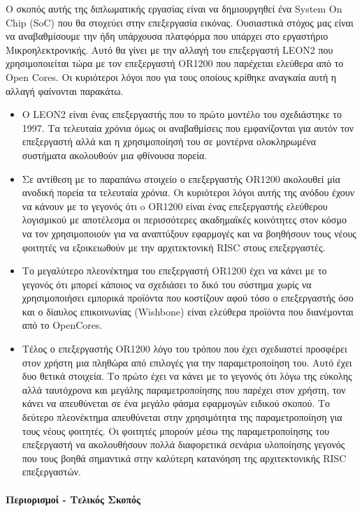 \documentclass[a4paper,10pt]{article}
\numberwithin{figure}{section}
\numberwithin{table}{section}
\begin{document}
Ο σκοπός αυτής της διπλωματικής εργασίας είναι να δημιουργηθεί ένα System On Chip (SoC) που θα στοχεύει στην επεξεργασία εικόνας. Ουσιαστικά στόχος μας είναι να αναβαθμίσουμε την ήδη υπάρχουσα πλατφόρμα που υπάρχει στο εργαστήριο Μικροηλεκτρονικής. Αυτό θα γίνει με την αλλαγή του επεξεργαστή LEON2 που χρησιμοποιείται τώρα με τον επεξεργαστή OR1200 που παρέχεται ελεύθερα από το Open Cores. Οι κυριότεροι λόγοι που για τους οποίους κρίθηκε αναγκαία αυτή η αλλαγή φαίνονται παρακάτω.
\begin{itemize}
 \item O LEON2 είναι ένας επεξεργαστής που το πρώτο μοντέλο του σχεδιάστηκε το 1997. Τα τελευταία χρόνια όμως οι αναβαθμίσεις που εμφανίζονται για αυτόν τον επεξεργαστή αλλά και η χρησιμοποίησή του σε μοντέρνα ολοκληρωμένα συστήματα ακολουθούν μια φθίνουσα πορεία.
 \item Σε αντίθεση με το παραπάνω στοιχείο ο επεξεργαστής OR1200 ακολουθεί μία ανοδική πορεία τα τελευταία χρόνια. Οι κυριότεροι λόγοι αυτής της ανόδου έχουν να κάνουν με το γεγονός ότι o OR1200 είναι ένας επεξεργαστής ελεύθερου λογισμικού με αποτέλεσμα οι περισσότερες ακαδημαϊκές κοινότητες στον κόσμο να τον χρησιμοποιούν για να αναπτύξουν εφαρμογές και να βοηθήσουν τους νέους φοιτητές να εξοικειωθούν με την αρχιτεκτονική RISC στους επεξεργαστές.
 \item Το μεγαλύτερο πλεονέκτημα του επεξεργαστή OR1200 έχει να κάνει με το γεγονός ότι μπορεί κάποιος να σχεδιάσει το δικό του σύστημα χωρίς να χρησιμοποιήσει εμπορικά προϊόντα που κοστίζουν αφού τόσο ο επεξεργαστής όσο και ο δίαυλος επικοινωνίας (Wishbone) είναι ελεύθερα προϊόντα που διανέμονται από το OpenCores.
 \item Τέλος ο επεξεργαστής ΟR1200 λόγο του τρόπου που έχει σχεδιαστεί προσφέρει στον χρήστη μια πληθώρα από επιλογές για την παραμετροποίηση του. Αυτό έχει δυο θετικά στοιχεία. Το πρώτο έχει να κάνει με το γεγονός ότι λόγω της εύκολης αλλά ταυτόχρονα και μεγάλης παραμετροποίησης που παρέχει στον χρήστη, τον κάνει να απευθύνεται σε ένα μεγάλο φάσμα εφαρμογών ειδικού σκοπού. Το δεύτερο πλεονέκτημα απευθύνεται στην χρησιμότητα της παραμετροποίηση για τους νέους φοιτητές. Οι φοιτητές μπορούν μέσω της παραμετροποίησης του επεξεργαστή να ακολουθήσουν πολλά διαφορετικά σενάρια υλοποίησης γεγονός που τους βοηθά σημαντικά στην καλύτερη κατανόηση της αρχιτεκτονικής RISC επεξεργαστών. 
\end{itemize}

\newpage
\paragraph{\newline\newline Περιορισμοί - Τελικός Σκοπός\newline\newline}
\end{document}
